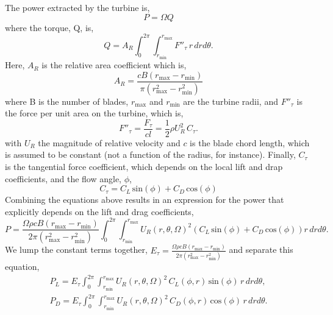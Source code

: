 The power extracted by the turbine is, 
\begin{equation}
 P = \Omega Q
\end{equation}
where the torque, Q, is\cite{morgado2014validation}, 
\begin{equation}
 Q = A_R \int_0^{2\pi} \int_{r_{\text{min}}}^{r_{\text{max}}} F''_{\tau}\, r\, dr d\theta.
\end{equation}
Here, $A_R$ is the relative area coefficient which is, 
\begin{equation}
A_R = \frac{c B (r_{\text{max}}-r_{\text{min}})}{\pi(r_{\text{max}}^2-r_{\text{min}}^2)}
\end{equation}
where B is the number of blades, $r_{\text{max}}$ and $r_{\text{min}}$
are the turbine radii, and $F''_{\tau}$ is the force per unit
area on the turbine, which is, 
\begin{equation}
 F''_{\tau} = \frac{F_{\tau}}{cl}= \frac{1}{2}\rho U_R^2 \, C_{\tau}.
\end{equation}
with $U_R$ the magnitude of relative velocity and $c$ is the blade chord
length, which is assumed to be constant (not a function of the radius,
for instance). Finally, $C_{\tau}$ is the tangential force coefficient,
which depends on the local lift and drap coefficients, and the
flow angle, $\phi$, 
\begin{equation}
 C_{\tau} = C_L \,\text{sin}(\phi) + C_D \,\text{cos}(\phi)
\end{equation}
Combining the equations above results in an expression for the power
that explicitly depends on the lift and drag coefficients, 
\begin{equation*}
 P = \frac{\Omega \rho c B (r_{\text{max}}-r_{\text{min}})}{2 \pi(r_{\text{max}}^2-r_{\text{min}}^2)}
\int_0^{2\pi}
\int_{r_{\text{min}}}^{r_{\text{max}}} U_R(r,\theta,\Omega)^2 \left(C_L
						     \,\text{sin}(\phi)
						     + C_D
						     \,\text{cos}(\phi)
						    \right) r\,dr d\theta. 
\end{equation*}
We lump the constant terms together, $E_{\tau} = \frac{\Omega \rho c B (r_{\text{max}}-r_{\text{min}})}{2 \pi(r_{\text{max}}^2-r_{\text{min}}^2)}$ and separate this equation, 
\begin{align}
 P_L = E_\tau
 \int_0^{2\pi}
  \int_{r_{\text{min}}}^{r_{\text{max}}} U_R(r,\theta,\Omega)^2 \, C_L(\phi,r)
 \,\text{sin}(\phi)\, r\,dr d\theta,  \label{lift} \\
 P_D = E_\tau
 \int_0^{2\pi}
  \int_{r_{\text{min}}}^{r_{\text{max}}} U_R(r,\theta,\Omega)^2 \, C_D(\phi,r) \,\text{cos}(\phi)\, r\,dr d\theta. \label{drag}
\end{align}

